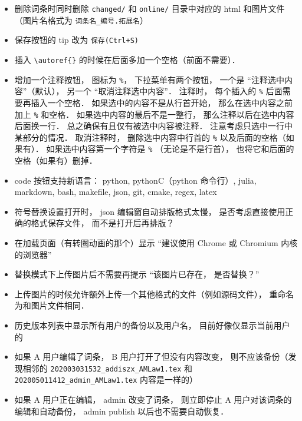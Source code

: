 \begin{itemize}
\item 删除词条时同时删除 \verb|changed/| 和 \verb|online/| 目录中对应的 html 和图片文件 （图片名格式为 \verb|词条名_编号.拓展名|）

\item 保存按钮的 tip 改为 \verb|保存(Ctrl+S)|

\item 插入 \verb|\autoref{}| 的时候在后面多加一个空格（前面不需要）．

\item 增加一个注释按钮， 图标为 \verb|%|， 下拉菜单有两个按钮， 一个是 “注释选中内容”（默认）， 另一个 “取消注释选中内容”． 注释时， 每个插入的 \verb|%| 后面需要再插入一个空格． 如果选中的内容不是从行首开始， 那么在选中内容之前加上 \verb|%| 和空格． 如果选中内容的最后不是一整行， 那么注释以后在选中内容后面换一行． 总之确保有且仅有被选中内容被注释． 注意考虑只选中一行中某部分的情况． 取消注释时， 删除选中内容中行首的 \verb|%| 以及后面的空格（如果有）． 如果选中内容第一个字符是 \verb|%| （无论是不是行首）， 也将它和后面的空格（如果有）删掉．

\item code 按钮支持新语言： python, pythonC（python 命令行）, julia, markdown, bash, makefile, json, git, cmake, regex, latex

\item 符号替换设置打开时， json 编辑窗自动排版格式太慢， 是否考虑直接使用正确的格式保存文件， 而不是打开后再排版？

\item 在加载页面（有转圈动画的那个）显示 “建议使用 Chrome 或 Chromium 内核的浏览器”

\item 替换模式下上传图片后不需要再提示 “该图片已存在， 是否替换？”

\item 上传图片的时候允许额外上传一个其他格式的文件（例如源码文件）， 重命名为和图片文件相同．

\item 历史版本列表中显示所有用户的备份以及用户名， 目前好像仅显示当前用户的

\item 如果 A 用户编辑了词条， B 用户打开了但没有内容改变， 则不应该备份（发现相邻的 \verb|202003031532_addiszx_AMLaw1.tex| 和 \verb|202005011412_admin_AMLaw1.tex| 内容是一样的）

\item 如果 A 用户正在编辑， admin 改变了词条， 则立即停止 A 用户对该词条的编辑和自动备份， admin publish 以后也不需要自动恢复．


\end{itemize}

